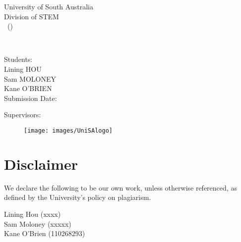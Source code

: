 \begin{titlepage}
\centering
{\Large University of South Australia\\ \vspace{1ex}Division of STEM\\ \vspace{1ex}}
{\Large \courseName \ (\textbf{\courseCode})}

{\Large \textbf{\submissionType}\\ \vfill

{\Huge \textbf{\submissionTitle}}

\par\vspace*{1\baselineskip}
{\large Students:\\}
{\Large Lining HOU\\ Sam MOLONEY\\ Kane O'BRIEN\\}
\vfill
{\Large Submission Date: \dueDate \\}
\vspace{1em}

{\large Supervisors:}
\vspace{0.5em}

{\Large \supervisors}
\begin{figure}[b]\centering \hfill \texttt{[image: images/UniSAlogo]}\end{figure}}
\end{titlepage}
\newpage



\section*{Disclaimer}
\begin{centering}We declare the following to be our own work, unless otherwise referenced, as defined by the University's policy on plagiarism.\\
\end{centering}
\begin{flushright}
    Lining Hou (xxxx)\\\vspace*{\baselineskip}
    Sam Moloney (xxxxx)\\\vspace*{\baselineskip}
    Kane O'Brien (110268293)\\\vspace*{\baselineskip}
\end{flushright}
\vfill
\clearpage



\tableofcontents
\clearpage
\listoffigures
\listoftables
\clearpage
